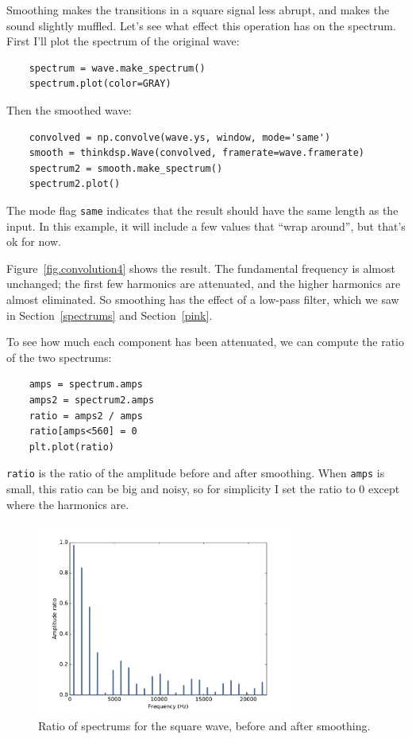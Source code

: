 \documentclass[12pt]{book}
\begin{document}
Smoothing makes the transitions in a square signal less abrupt,
and makes the sound slightly muffled.  Let's see what effect this
operation has on the spectrum.  First I'll plot the spectrum
of the original wave:

\begin{verbatim}
    spectrum = wave.make_spectrum()
    spectrum.plot(color=GRAY)
\end{verbatim}

Then the smoothed wave:

\begin{verbatim}
    convolved = np.convolve(wave.ys, window, mode='same')
    smooth = thinkdsp.Wave(convolved, framerate=wave.framerate)
    spectrum2 = smooth.make_spectrum()
    spectrum2.plot()
\end{verbatim}

The mode flag {\tt same} indicates that the result should have the
same length as the input.  In this example, it will include a few values
that ``wrap around'', but that's ok for now.

Figure~\ref{fig.convolution4} shows the result.  The fundamental
frequency is almost unchanged; the first few harmonics are
attenuated, and the higher harmonics are almost eliminated.  So
smoothing has the effect of a low-pass filter, which we
saw in Section~\ref{spectrums} and Section~\ref{pink}.

To see how much each component has been attenuated, we can
compute the ratio of the two spectrums:

\begin{verbatim}
    amps = spectrum.amps
    amps2 = spectrum2.amps
    ratio = amps2 / amps
    ratio[amps<560] = 0
    plt.plot(ratio)
\end{verbatim}

{\tt ratio} is the ratio of the amplitude before and after
smoothing.  When {\tt amps} is small, this ratio can be big
and noisy, so for simplicity I set the ratio to 0 except
where the harmonics are.

\begin{figure}
\centerline{\includegraphics[height=2.5in]{figs/convolution5.pdf}}
\caption{Ratio of spectrums for the square wave, before and after smoothing.}
\label{fig.convolution5}
\end{figure}
\end{document}
